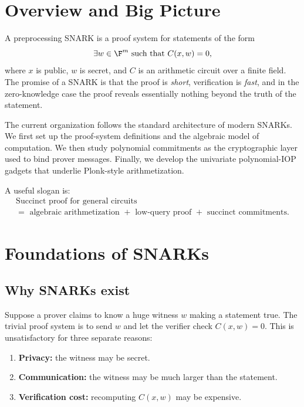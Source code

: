﻿\section{Overview and Big Picture}

A preprocessing SNARK is a proof system for statements of the form
\[
\exists w \in \F^m \text{ such that } C(x,w)=0,
\]
where $x$ is public, $w$ is secret, and $C$ is an arithmetic circuit over a finite field. The promise of a SNARK is that the proof is \emph{short}, verification is \emph{fast}, and in the zero-knowledge case the proof reveals essentially nothing beyond the truth of the statement.

The current organization follows the standard architecture of modern SNARKs. We first set up the proof-system definitions and the algebraic model of computation. We then study polynomial commitments as the cryptographic layer used to bind prover messages. Finally, we develop the univariate polynomial-IOP gadgets that underlie Plonk-style arithmetization.

A useful slogan is:
\[
\boxed{
\begin{array}{c}
\text{Succinct proof for general circuits}\\[0.2em]
=\text{ algebraic arithmetization }+\text{ low-query proof }+\text{ succinct commitments}.
\end{array}}
\]

\section{Foundations of SNARKs}

\subsection{Why SNARKs exist}

Suppose a prover claims to know a huge witness $w$ making a statement true. The trivial proof system is to send $w$ and let the verifier check $C(x,w)=0$. This is unsatisfactory for three separate reasons:
\begin{enumerate}[leftmargin=2em]
    \item \textbf{Privacy:} the witness may be secret.
    \item \textbf{Communication:} the witness may be much larger than the statement.
    \item \textbf{Verification cost:} recomputing $C(x,w)$ may be expensive.
\end{enumerate}

